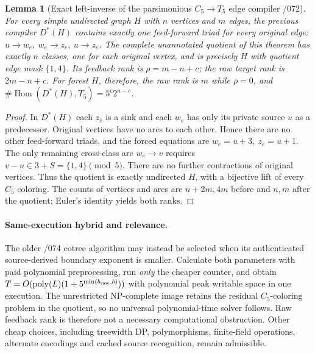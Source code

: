\documentclass[11pt]{article}
\newtheorem{lemma}{Lemma}
\begin{document}
\begin{lemma}[Exact left-inverse of the parsimonious $C_5\to T_5$
edge compiler /072]
For every simple undirected graph $H$ with $n$ vertices and
$m$ edges, the previous compiler $D^*(H)$ contains exactly
one feed-forward triad for every original edge:
$u\to w_e,\ w_e\to z_e,\ u\to z_e$.
The complete unannotated quotient of this theorem has exactly
$n$ classes, one for each original vertex, and is precisely
$H$ with quotient edge mask $\{1,4\}$.
Its feedback rank is $\rho=m-n+c$; the raw target rank is
$2m-n+c$.
For forest $H$, therefore, the raw rank is $m$ while $\rho=0$,
and $\#\operatorname{Hom}(D^*(H),T_5)=5^c2^{n-c}$.
\end{lemma}
\begin{proof}
In $D^*(H)$ each $z_e$ is a sink and each $w_e$ has only
its private source $u$ as a predecessor. Original vertices
have no arcs to each other. Hence there are no other
feed-forward triads, and the forced equations are
$w_e=u+3,\ z_e=u+1$. The only remaining cross-class arc
$w_e\to v$ requires
$v-u\in3+S=\{1,4\}\pmod5$.
There are no further contractions of original vertices.
Thus the quotient is exactly undirected $H$, with a
bijective lift of every $C_5$ coloring. The counts of
vertices and arcs are $n+2m,4m$ before and $n,m$ after
the quotient; Euler's identity yields both ranks.
\end{proof}

\paragraph{Same-execution hybrid and relevance.}
The older /074 cotree algorithm may instead be selected when
its authenticated source-derived boundary exponent is smaller.
Calculate both parameters with paid polynomial preprocessing,
run \emph{only} the cheaper counter, and obtain
$T=O(\mathrm{poly}(L)(1+5^{\min(b_{\rm raw},b)}))$ with
polynomial peak writable space in one execution.
The unrestricted NP-complete image retains the residual
$C_5$-coloring problem in the quotient, so no universal
polynomial-time solver follows. Raw feedback rank is
therefore not a necessary computational obstruction.
Other cheap choices, including treewidth DP, polymorphisms,
finite-field operations, alternate encodings and cached
source recognition, remain admissible.
\end{document}

